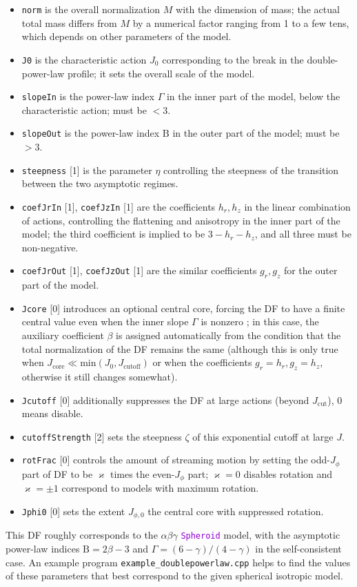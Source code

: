 \documentclass[12pt]{article}
\newcommand{\ttt}[1]{\textcolor{darkviolet}{\texttt{#1}}}
\newcommand{\ppp}[1]{\textcolor{darkolive} {\texttt{#1}}}
\newcommand{\Beta}{\mathrm B}
\begin{document}
\begin{itemize}
\item \ppp{norm} is the overall normalization $M$ with the dimension of mass; the actual total mass differs from $M$ by a numerical factor ranging from 1 to a few tens, which depends on other parameters of the model. 
\item \ppp{J0} is the characteristic action $J_0$ corresponding to the break in the double-power-law profile; it sets the overall scale of the model.
\item \ppp{slopeIn} is the power-law index $\Gamma$ in the inner part of the model, below the characteristic action; must be $<3$.
\item \ppp{slopeOut} is the power-law index $\Beta$ in the outer part of the model; must be $>3$.
\item \ppp{steepness} [1] is the parameter $\eta$ controlling the steepness of the transition between the two asymptotic regimes.
\item \ppp{coefJrIn} [1], \ppp{coefJzIn} [1] are the coefficients $h_r, h_z$ in the linear combination of actions, controlling the flattening and anisotropy in the inner part of the model; the third coefficient is implied to be $3-h_r-h_z$, and all three must be non-negative.
\item \ppp{coefJrOut} [1], \ppp{coefJzOut} [1] are the similar coefficients $g_r, g_z$ for the outer part of the model.
\item \ppp{Jcore} [0] introduces an optional central core, forcing the DF to have a finite central value even when the inner slope $\Gamma$ is nonzero \cite{ColeBinney2017}; in this case, the auxiliary coefficient $\beta$ is assigned automatically from the condition that the total normalization of the DF remains the same (although this is only true when $J_\mathrm{core}\ll \mathrm{min}(J_0, J_\mathrm{cutoff})$ or when the coefficients $g_r=h_r, g_z=h_z$, otherwise it still changes somewhat).
\item \ppp{Jcutoff} [0] additionally suppresses the DF at large actions (beyond $J_\mathrm{cut}$), 0  means disable.
\item \ppp{cutoffStrength} [2] sets the steepness $\zeta$ of this exponential cutoff at large $J$.
\item \ppp{rotFrac} [0] controls the amount of streaming motion by setting the odd-$J_\phi$ part of DF to be $\varkappa$ times the even-$J_\phi$ part; $\varkappa=0$ disables rotation and $\varkappa=\pm 1$ correspond to models with maximum rotation.
\item \ppp{Jphi0} [0] sets the extent $J_{\phi,0}$ the central core with suppressed rotation.
\end{itemize}
This DF roughly corresponds to the $\alpha\beta\gamma$ \ttt{Spheroid} model, with the asymptotic power-law indices $\Beta=2\beta-3$ and $\Gamma=(6-\gamma)/(4-\gamma)$ in the self-consistent case. An example program \texttt{example_doublepowerlaw.cpp} helps to find the values of these parameters that best correspond to the given spherical isotropic model.
\end{document}
